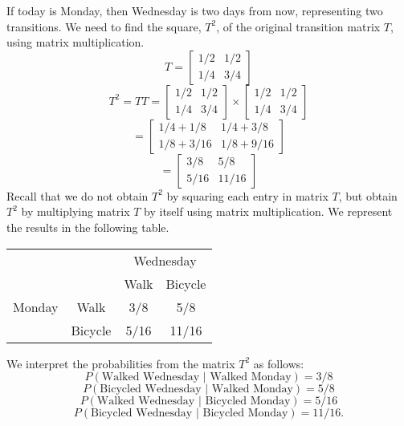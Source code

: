 \begin{solution}
    If today is Monday, then Wednesday is two days from now, representing two transitions. We need to find the square, \( T^2 \), of the original transition matrix \( T \), using matrix multiplication.
    \[ T = \begin{bmatrix} 1/2 & 1/2 \\ 1/4 & 3/4 \end{bmatrix} \]
    \[ T^2 = TT = \begin{bmatrix} 1/2 & 1/2 \\ 1/4 & 3/4 \end{bmatrix} \times \begin{bmatrix} 1/2 & 1/2 \\ 1/4 & 3/4 \end{bmatrix} \]
    \[ = \begin{bmatrix} 1/4+1/8 & 1/4+3/8 \\ 1/8+3/16 & 1/8+9/16 \end{bmatrix} \]
    \[ = \begin{bmatrix} 3/8 & 5/8 \\ 5/16 & 11/16 \end{bmatrix} \]
    Recall that we do not obtain \( T^2 \) by squaring each entry in matrix \( T \), but obtain \( T^2 \) by multiplying matrix \( T \) by itself using matrix multiplication.
    We represent the results in the following table.
    \begin{center}
        \begin{tabular}{cc|cc}
                   &         & \multicolumn{2}{c}{Wednesday}           \\
                   &         & Walk                          & Bicycle \\
            \hline
            Monday & Walk    & 3/8                           & 5/8     \\
                   & Bicycle & 5/16                          & 11/16   \\
        \end{tabular}
    \end{center}


    We interpret the probabilities from the matrix \( T^2 \) as follows:
    \[ P(\text{Walked Wednesday }| \text{ Walked Monday}) = 3/8 \]
    \[ P(\text{Bicycled Wednesday }| \text{ Walked Monday}) = 5/8 \]
    \[ P(\text{Walked Wednesday }| \text{ Bicycled Monday}) = 5/16 \]
    \[ P(\text{Bicycled Wednesday }| \text{ Bicycled Monday}) = 11/16. \]
\end{solution}


